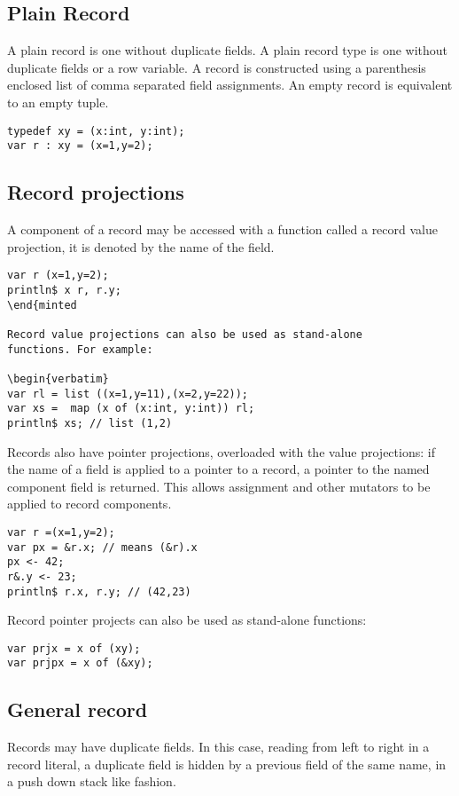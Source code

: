 \documentclass[oneside]{book}
\begin{document}
\subsection{Plain Record}
A plain record is one without duplicate fields. A plain record
type is one without duplicate fields or a row variable.
A record is constructed using a parenthesis enclosed list
of comma separated field assignments. An empty record is
equivalent to an empty tuple.

\begin{verbatim}
typedef xy = (x:int, y:int);
var r : xy = (x=1,y=2);
\end{verbatim}

\subsection{Record projections}
A component of a record may be accessed with a 
function called a record value projection, it is denoted
by the name of the field.

\begin{verbatim}
var r (x=1,y=2);
println$ x r, r.y;
\end{minted

Record value projections can also be used as stand-alone
functions. For example:

\begin{verbatim}
var rl = list ((x=1,y=11),(x=2,y=22));
var xs =  map (x of (x:int, y:int)) rl;
println$ xs; // list (1,2)
\end{verbatim}

Records also have pointer projections, overloaded with
the value projections: if the name of
a field is applied to a pointer to a record,
a pointer to the named component field is returned.
This allows assignment and other mutators to be
applied to record components.

\begin{verbatim}
var r =(x=1,y=2);
var px = &r.x; // means (&r).x
px <- 42;
r&.y <- 23;
println$ r.x, r.y; // (42,23)
\end{verbatim}

Record pointer projects can also be used as stand-alone functions:

\begin{verbatim}
var prjx = x of (xy);
var prjpx = x of (&xy);
\end{verbatim}

\subsection{General record}
Records may have duplicate fields. In this case, reading from left
to right in a record literal, a duplicate field is hidden by a previous 
field of the same name, in a push down stack like fashion.
 
\end{document}
